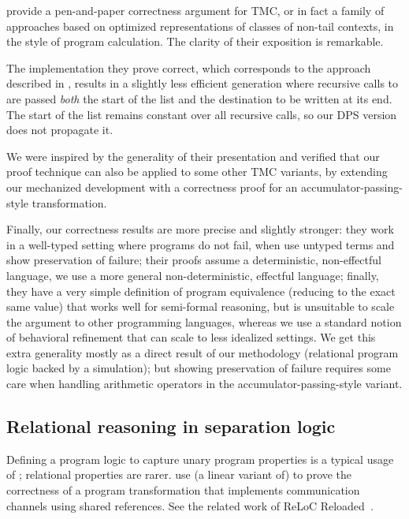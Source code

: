 \citet*{tmc-koka-2023} provide a pen-and-paper correctness argument for TMC, or in fact a family of approaches based on optimized representations of classes of non-tail contexts, in the style of program calculation.
The clarity of their exposition is remarkable.

The implementation they prove correct, which corresponds to the approach described in \citet*{minamide-98}, results in a slightly less efficient generation where recursive calls to  are passed \emph{both} the start of the list and the destination to be written at its end.
The start of the list remains constant over all recursive calls, so our DPS version does not propagate it.

We were inspired by the generality of their presentation and verified that our proof technique can also be applied to some other TMC variants, by extending our mechanized development with a correctness proof for an
accumulator-passing-style transformation.

Finally, our correctness results are more precise and slightly stronger: they work in a well-typed setting where programs do not fail, when use untyped terms and show preservation of failure; their proofs assume a deterministic, non-effectful language, we use a more general non-deterministic, effectful language; finally, they have a very simple definition of program equivalence (reducing to the exact same value) that works well for semi-formal reasoning, but is unsuitable to scale the argument to other programming languages, whereas we use a standard notion of behavioral refinement that can scale to less idealized settings.
%
We get this extra generality mostly as a direct result of our methodology (relational program logic backed by a simulation); but showing preservation of failure requires some care when handling arithmetic operators in the accumulator-passing-style variant.

\subsection{Relational reasoning in separation logic}

Defining a program logic to capture unary program properties is a typical usage of \Iris; relational properties are rarer. \citet*{tassarotti-2017} use (a linear variant of) \Iris to prove the correctness of a program transformation that implements communication channels using shared references. See the related work of ReLoC Reloaded~\citep*{reloc-2021}.

